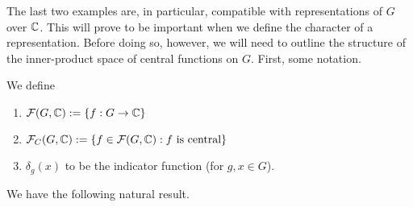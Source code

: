 The last two examples are, in particular, compatible with representations of $G$ over $\mathbb{C}$. This will prove to be important when we define the character of a representation. Before doing so, however, we will need to outline the structure of the inner-product space of central functions on $G$. First, some notation.

\begin{boxnotation}
    We define
    \begin{enumerate}
        \item $\mathcal{F}\!\left( G, \mathbb{C} \right) := \left\{ f : G \to \mathbb{C} \right\}$
        \item $\mathcal{F}_C\!\left( G, \mathbb{C} \right) := \left\{ f \in \mathcal{F}\!\left( G, \mathbb{C} \right) : f \text{ is central} \right\}$
        \item $\delta_g(x)$ to be the indicator function (for $g, x \in G$).
    \end{enumerate}
\end{boxnotation}

We have the following natural result.

